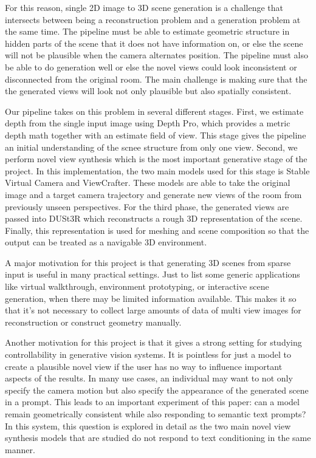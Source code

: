 \documentclass{article}
\begin{document}
For this reason, single 2D image to 3D scene generation is a challenge that intersects between being a reconstruction problem and a generation problem at the same time. The pipeline must be able to estimate geometric structure in hidden parts of the scene that it does not have information on, or else the scene will not be plausible when the camera alternates position. The pipeline must also be able to do generation well or else the novel views could look inconsistent or disconnected from the original room. The main challenge is making sure that the the generated views will look not only plausible but also spatially consistent.

Our pipeline takes on this problem in several different stages. First, we estimate depth from the single input image using Depth Pro, which provides a metric depth math together with an estimate field of view. This stage gives the pipeline an initial understanding of the scnee structure from only one view. Second, we perform novel view synthesis which is the most important generative stage of the project. In this implementation, the two main models used for this stage is Stable Virtual Camera and ViewCrafter. These models are able to take the original image and a target camera trajectory and generate new views of the room from previously unseen  perspectives. For the third phase, the generated views are passed into DUSt3R which reconstructs a rough 3D representation of the scene. Finally, this representation is used for meshing and scene composition so that the output can be treated as a navigable 3D environment.

A major motivation for this project is that generating 3D scenes from sparse input is useful in many practical settings. Just to list some generic applications like virtual walkthrough, environment prototyping, or interactive scene generation, when there may be limited information available. This makes it so that it's not necessary to collect large amounts of data of multi view images for reconstruction or construct geometry manually.

Another motivation for this project is that it gives a strong setting for studying controllability in generative vision systems. It is pointless for just a model to create a plausible novel view if the user has no way to influence important aspects of the results. In many use cases, an individual may want to not only specify the camera motion but also specify the appearance of the generated scene in a prompt. This leads to an important experiment of this paper: can a model remain geometrically consistent while also responding to semantic text prompts? In this system, this question is explored in detail as the two main novel view synthesis models that are studied do not respond to text conditioning in the same manner.
\end{document}
